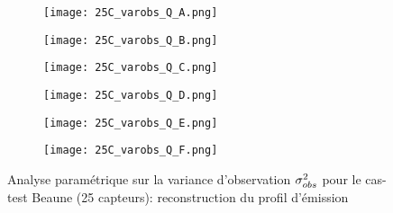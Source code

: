   
  \begin{figure}[p!]
  	\centering
  	\begin{subfigure}[t]{0.5\textwidth}
  		\centering
  		\texttt{[image: 25C\_varobs\_Q\_A.png]}
  		\caption{}
  		\label{varA_q}
  	\end{subfigure}%
  	\begin{subfigure}[t]{0.5\textwidth}
  		\centering
  		\texttt{[image: 25C\_varobs\_Q\_B.png]}
  		\caption{}
  		\label{varB_q}
  	\end{subfigure}
  	\begin{subfigure}[t]{0.5\textwidth}
  		\centering
  		\texttt{[image: 25C\_varobs\_Q\_C.png]}
  		\caption{}
  		\label{varC_q}
  	\end{subfigure}%
  	\begin{subfigure}[t]{0.5\textwidth}
  		\centering
  		\texttt{[image: 25C\_varobs\_Q\_D.png]}
  		\caption{}
  		\label{varD_q}
  	\end{subfigure}
  	\begin{subfigure}[t]{0.5\textwidth}
  		\centering
  		\texttt{[image: 25C\_varobs\_Q\_E.png]}
  		\caption{}
  		\label{varE_q}
  	\end{subfigure}%
  	\begin{subfigure}[t]{0.5\textwidth}
  		\centering
  		\texttt{[image: 25C\_varobs\_Q\_F.png]}
  		\caption{}
  		\label{varF_q}
  	\end{subfigure}
  	\caption{Analyse paramétrique sur la variance d'observation ${\sigma_{obs}^2}$ pour le cas-test Beaune (25 capteurs): reconstruction du profil d'émission}
  	\label{fig_25C_analyse_varobs_q}
  \end{figure}
  
